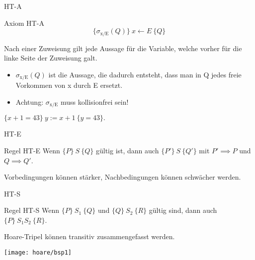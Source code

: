 \begin{frame}{HT-A}
	\begin{block} {Axiom HT-A}
		$$ \{\sigma_{\text{x/E}} (Q)\} \ x \leftarrow E \ \{Q\} $$
	\end{block}
	\pause
	Nach einer Zuweisung gilt jede Aussage für die Variable, welche vorher für die linke Seite der Zuweisung galt.
	\begin{itemize}
		\item $\sigma_{\text{x/E}} (Q) $ ist die Aussage, die dadurch entsteht, dass man in Q jedes freie Vorkommen von x durch E ersetzt.
		\item Achtung: $\sigma_{\text{x/E}}$ muss kollisionfrei sein!
	\end{itemize}
	\vspace{2em}
	\begin{Beispiel}
		$\{ x + 1 = 43\} \ y := x + 1\ \{y = 43 \}.$
	\end{Beispiel}
	
\end{frame}

\begin{frame}{HT-E}
	\begin{block}{Regel HT-E}
		Wenn $\{P\}\ S\ \{Q\}$ gültig ist, dann auch $\{P'\}\ S\ \{Q'\}$ mit $P' \implies P$ und $Q \implies Q'$.
	\end{block}
	\pause
	Vorbedingungen können stärker, Nachbedingungen können schwächer werden.

\end{frame}

\begin{frame}{HT-S}
	\begin{block}{Regel HT-S}
		Wenn $\{P\}\ S_1\ \{Q\}$ und $\{Q\}\ S_2\ \{R\}$ gültig sind, dann auch $\{P\}\ S_1 S_2\ \{R\}$. 
	\end{block}
	\pause
	Hoare-Tripel können transitiv zusammengefasst werden.
\end{frame}

\begin{frame}
	\texttt{[image: hoare/bsp1]}
\end{frame}

